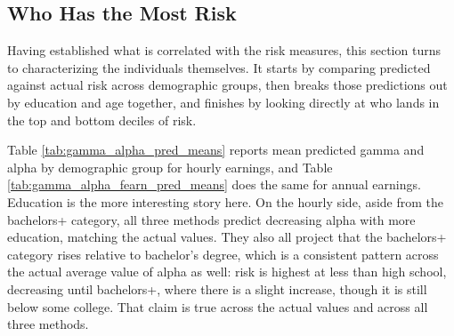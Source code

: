 \documentclass[12pt]{article}
\begin{document}
\begin{onehalfspace}
\subsection{Who Has the Most Risk}

Having established what is correlated with the risk measures, this section turns to characterizing the individuals themselves. It starts by comparing predicted against actual risk across demographic groups, then breaks those predictions out by education and age together, and finishes by looking directly at who lands in the top and bottom deciles of risk.

Table \ref{tab:gamma_alpha_pred_means} reports mean predicted gamma and alpha by demographic group for hourly earnings, and Table \ref{tab:gamma_alpha_fearn_pred_means} does the same for annual earnings. Education is the more interesting story here. On the hourly side, aside from the bachelors+ category, all three methods predict decreasing alpha with more education, matching the actual values. They also all project that the bachelors+ category rises relative to bachelor's degree, which is a consistent pattern across the actual average value of alpha as well: risk is highest at less than high school, decreasing until bachelors+, where there is a slight increase, though it is still below some college. That claim is true across the actual values and across all three methods.

\begin{table}[H]
    \centering
    \caption{Mean Predicted Gamma and Alpha by Demographic Group, Hourly Earnings}
    \label{tab:gamma_alpha_pred_means}
    \resizebox{\textwidth}{!}{%
        
    }
\end{table}

\begin{table}[H]
    \centering
    \caption{Mean Predicted Gamma and Alpha by Demographic Group, Annual Earnings}
    \label{tab:gamma_alpha_fearn_pred_means}
    \resizebox{\textwidth}{!}{%
        
    }
\end{table}



\end{onehalfspace}
\end{document}
